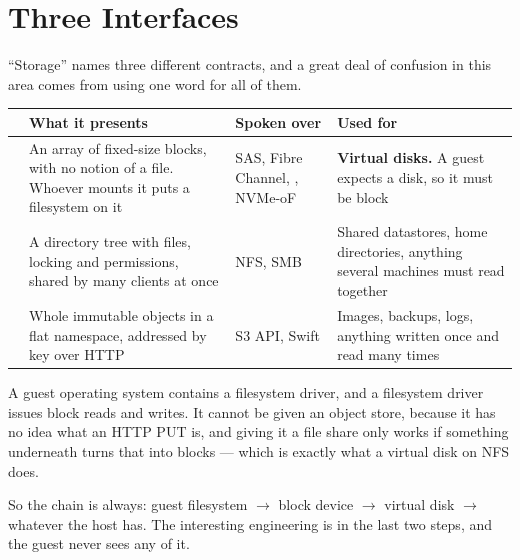 \section{Three Interfaces}

``Storage'' names three different contracts, and a great deal of confusion in
this area comes from using one word for all of them.

\begin{longtable}{@{}L{2.4cm}L{4.4cm}L{3.9cm}L{4.0cm}@{}}
\toprule
{}
& \textbf{What it presents} & \textbf{Spoken over} & \textbf{Used for} \\
\midrule
\endhead
{} & An array of fixed-size blocks, with no notion of a file. Whoever
mounts it puts a filesystem on it & SAS, Fibre Channel, , NVMe-oF &
\textbf{Virtual disks.} A guest expects a disk, so it must be block \\
 & A directory tree with files, locking and permissions, shared by
many clients at once & NFS, SMB & Shared datastores, home directories, anything
several machines must read together \\
 & Whole immutable objects in a flat namespace, addressed by key
over HTTP & S3 API, Swift & Images, backups, logs, anything written once and
read many times \\
\bottomrule
\end{longtable}

\begin{conceptbox}
A guest operating system contains a filesystem driver, and a filesystem driver
issues block reads and writes. It cannot be given an object store, because it
has no idea what an HTTP PUT is, and giving it a file share only works if
something underneath turns that into blocks --- which is exactly what a virtual
disk on NFS does.

\smallskip
So the chain is always: guest filesystem $\rightarrow$ block device
$\rightarrow$ virtual disk $\rightarrow$ whatever the host has. The interesting
engineering is in the last two steps, and the guest never sees any of it.
\end{conceptbox}

